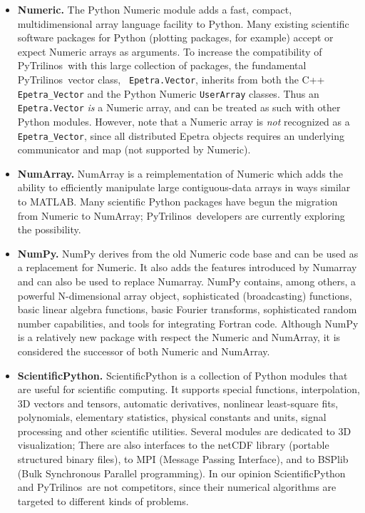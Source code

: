 \documentclass[acmtocl]{acmtrans2m}
\newcommand{\PyTrilinos}{{PyTrilinos}}
\begin{document}
\begin{itemize}

\item {\bf Numeric.} The Python Numeric module adds a fast, compact,
  multidimensional array language facility to Python.  Many existing
  scientific software packages for Python (plotting packages, for
  example) accept or expect Numeric arrays as arguments.  To increase
  the compatibility of \PyTrilinos\ with this large collection of
  packages, the fundamental \PyTrilinos\ vector class, {\tt
    Epetra.Vector}, inherits from both the C++ {\tt Epetra\_Vector}
  and the Python Numeric {\tt UserArray} classes.  Thus an {\tt
    Epetra.Vector} {\sl is} a Numeric array, and can be treated as
  such with other Python modules.  However, note that a Numeric array
  is {\sl not} recognized as a {\tt Epetra\_Vector}, since all
  distributed Epetra objects requires an underlying communicator and
  map (not supported by Numeric).

\item {\bf NumArray.}  NumArray is a reimplementation of Numeric which
  adds the ability to efficiently manipulate large contiguous-data
  arrays in ways similar to MATLAB.  Many scientific Python packages
  have begun the migration from Numeric to NumArray;
  \PyTrilinos\ developers are currently exploring the possibility.

\item {\bf NumPy.} NumPy derives from the old Numeric code base and can be
  used as a replacement for Numeric.   It also adds the features introduced by
  Numarray and can also be used to replace Numarray. NumPy contains, among
  others, a powerful N-dimensional array object, sophisticated (broadcasting)
  functions, basic linear algebra functions, basic Fourier transforms,
  sophisticated random number capabilities, and tools for integrating Fortran
  code. Although NumPy is a relatively new package with respect the Numeric
  and NumArray, it is considered the successor of both Numeric and NumArray.

\item {\bf ScientificPython.}  ScientificPython is a collection of
  Python modules that are useful for scientific computing.  It
  supports special functions, interpolation, 3D vectors and tensors,
  automatic derivatives, nonlinear least-square fits, polynomials,
  elementary statistics, physical constants and units, signal
  processing and other scientific utilities.  Several modules are
  dedicated to 3D visualization; There are also interfaces to the
  netCDF library (portable structured binary files), to MPI (Message
  Passing Interface), and to BSPlib (Bulk Synchronous Parallel
  programming).  In our opinion ScientificPython and \PyTrilinos\ are
  not competitors, since their numerical algorithms are targeted to
  different kinds of problems.


\end{itemize}
\end{document}
